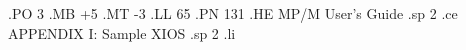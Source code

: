 .PO 3
.MB +5
.MT -3
.LL 65
.PN 131
.HE MP/M User's Guide
.sp 2
.ce
APPENDIX I:  Sample XIOS
.sp 2
.li
